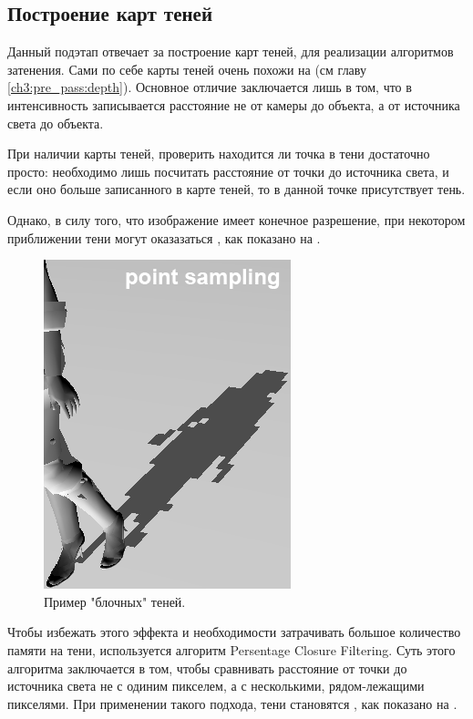 	\subsection{Построение карт теней} \label{ch3:pre_pass:shadow_maps}
		Данный подэтап отвечает за построение карт теней, для реализации алгоритмов затенения\cite{williams1978casting}. Сами по себе карты теней очень похожи на  (см главу \ref{ch3:pre_pass:depth}). Основное отличие заключается лишь в том, что в интенсивность записывается расстояние не от камеры до объекта, а от источника света до объекта.
		
		При наличии карты теней, проверить находится ли точка в тени достаточно просто: необходимо лишь посчитать расстояние от точки до источника света, и если оно больше записанного в карте теней, то в данной точке присутствует тень.
		
		Однако, в силу того, что изображение имеет конечное разрешение, при некотором приближении тени могут оказазаться , как показано на .
		 
		 \begin{figure}[ht!] 
		 	\center
		 	\includegraphics [scale=1] {my_folder/images//blocky_shadows}	
		 	\caption{Пример "блочных" теней.} 
		 	\label{fig:blocky_shadows}
		 \end{figure}
		 
		 Чтобы избежать этого эффекта и необходимости затрачивать большое количество памяти на тени, используется алгоритм Persentage Closure Filtering\cite{fernando2005percentage}. Суть этого алгоритма заключается в том, чтобы сравнивать расстояние от точки до источника света не с одиним пикселем, а с несколькими, рядом-лежащими пикселями. При применении такого подхода, тени становятся , как показано на .
		 
